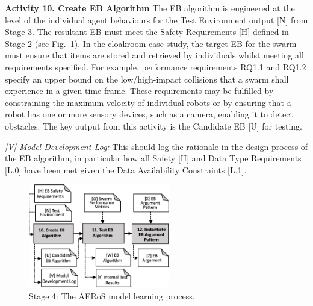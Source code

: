 \documentclass[runningheads]{llncs}
\begin{document}
\noindent\textbf{Activity 10. Create EB Algorithm} The EB algorithm is engineered at the level of the individual agent behaviours for the Test Environment output [N] from Stage 3. The resultant EB must meet the Safety Requirements [H] defined in Stage 2 (see Fig.~\ref{amlas-a-stage4}). 
In the cloakroom case study, the target EB for the swarm must ensure that items are stored and retrieved by individuals whilst meeting all requirements specified. For example, performance requirements RQ1.1 and RQ1.2 specify an upper bound on the low/high-impact collisions that a swarm shall experience in a given time frame. 
These requirements may be fulfilled by constraining the maximum velocity of individual robots or by ensuring that a robot has one or more sensory devices, such as a camera, enabling it to detect obstacles. 
The key output from this activity is the Candidate EB [U] for testing.

\emph{[V] Model Development Log:} This should log the rationale in the design process of the EB algorithm, in particular how all Safety [H] and Data Type Requirements [L.0] have been met given the Data Availability Constraints [L.1].

\begin{figure}[!t]
	\centering
	\includegraphics[width=0.55\textwidth]{figures/AERoS-Stage4.png}%
	\vspace{-2ex}
	\caption{Stage 4: The AERoS model learning process.}
	\label{amlas-a-stage4}
	\vspace{-4ex}
\end{figure}
\end{document}
